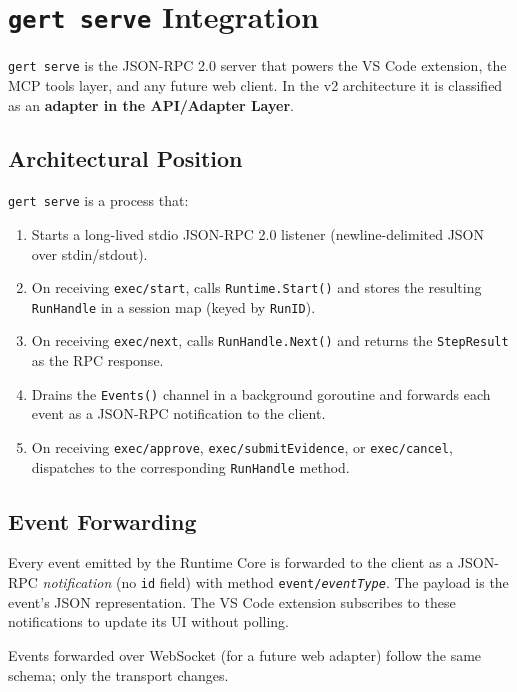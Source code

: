 \section{\texttt{gert serve} Integration}

\texttt{gert serve} is the JSON-RPC 2.0 server that powers the VS Code extension, the MCP
tools layer, and any future web client. In the v2 architecture it is classified as an
\textbf{adapter in the API/Adapter Layer}.

\subsection{Architectural Position}

\texttt{gert serve} is a process that:
\begin{enumerate}
  \item Starts a long-lived stdio JSON-RPC 2.0 listener (newline-delimited JSON over stdin/stdout).
  \item On receiving \texttt{exec/start}, calls \texttt{Runtime.Start()} and stores the
        resulting \texttt{RunHandle} in a session map (keyed by \texttt{RunID}).
  \item On receiving \texttt{exec/next}, calls \texttt{RunHandle.Next()} and returns the
        \texttt{StepResult} as the RPC response.
  \item Drains the \texttt{Events()} channel in a background goroutine and forwards each
        event as a JSON-RPC notification to the client.
  \item On receiving \texttt{exec/approve}, \texttt{exec/submitEvidence}, or
        \texttt{exec/cancel}, dispatches to the corresponding \texttt{RunHandle} method.
\end{enumerate}

\subsection{Event Forwarding}

Every event emitted by the Runtime Core is forwarded to the client as a JSON-RPC
\emph{notification} (no \texttt{id} field) with method \texttt{event/\textit{eventType}}.
The payload is the event's JSON representation. The VS Code extension subscribes to
these notifications to update its UI without polling.

Events forwarded over WebSocket (for a future web adapter) follow the same schema;
only the transport changes.

